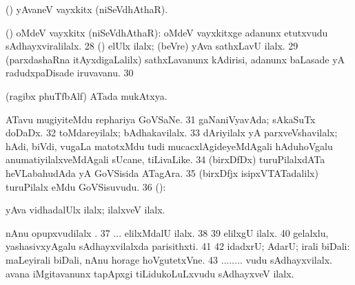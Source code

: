 { (\sanA) yAvaneV vayxkitx (niSeVdhAthaR).

 (\gu) oMdeV vayxkitx (niSeVdhAthaR):  oMdeV vayxkitxge adanunx etutxvudu sAdhayxviralilalx.
\num{28}  (\ame) elUlx ilalx; (beVre) yAva sathxLavU ilalx.
\num{29} (parxdashaRna itAyxdigaLalilx) sathxLavanunx
kAdirisi, adanunx baLasade yA radudxpaDisade iruvavanu.
\num{30} 

 (ragibx phuTfbAlf) ATada mukAtxya.

 ATavu mugiyiteMdu rephariya GoVSaNe.
\num{31}  gaNaniVyavAda; sAkaSuTx doDaDx.
\num{32}  toMdareyilalx; bAdhakavilalx.
\num{33}  dAriyilalx yA parxveVshavilalx; hAdi,
biVdi, \mo vugaLa matotxMdu tudi mucacxlAgideyeMdAgali hAduhoVgalu
anumatiyilalxveMdAgali sUcane, tiLivaLike.
\num{34}  (birxDfDx) turuPilalxdATa heVLabahudAda yA GoVSisida ATagAra.
\num{35} (birxDfjx isipxVTATadalilx) turuPilalx eMdu GoVSisuvudu.
\num{36} (\AmA):

 yAva vidhadalUlx ilalx; ilalxveV ilalx.

 nAnu opupxvudilalx \mo.
\num{37} ... elilxMdalU ilalx.
\num{38} 
\num{39}  elilxgU ilalx.
\num{40}  gelalxlu, yashasivxyAgalu sAdhayxvilalxda parisithxti.
\num{41} 
\num{42}  idadxrU; AdarU; irali biDali:  maLeyirali biDali, nAnu horage hoVgutetxVne. 
\num{43} ........ vudu
sAdhayxvilalx.  avana
iMgitavanunx tapApxgi tiLidukoLuLxvudu sAdhayxveV ilalx.}
\eentry

\bentry
{}
\gl{\kirxvi}
{}

\noindent
\gl{\pagu}
\eentry

